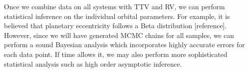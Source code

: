 Once we combine data on all systems with TTV and RV, we can perform statistical inference on the individual orbital parameters.
For example, it is believed that planetary eccentricity follows a Beta distribution [reference].
However, since we will have generated MCMC chains for all samples, we can perform a sound Bayesian analysis which incorporates highly accurate errors for each data point.
If time allows it, we may also perform more sophisticated statistical analysis such as high order asymptotic inference.